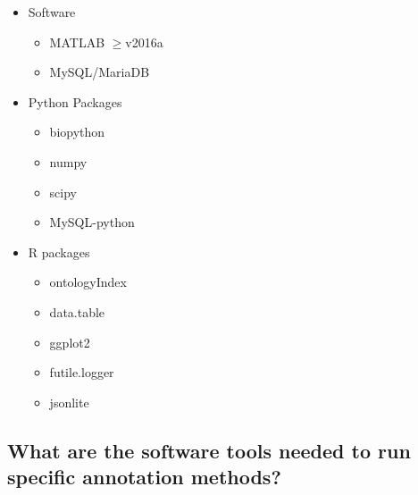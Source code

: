 \begin{itemize}
\begin{itemize}
     \item Software
     \begin{itemize}
       \item MATLAB $\geq$v2016a
       \item MySQL/MariaDB
     \end{itemize}
    
     \item Python Packages
     \begin{itemize}
      \item biopython
      \item numpy
      \item scipy
      \item MySQL-python
     \end{itemize}
    
     \item R packages
     \begin{itemize}
      \item ontologyIndex
      \item data.table
      \item ggplot2
      \item futile.logger
      \item jsonlite
     \end{itemize}
\end{itemize}
\end{itemize}


\subsection{What are the software tools needed to run specific annotation methods?}

